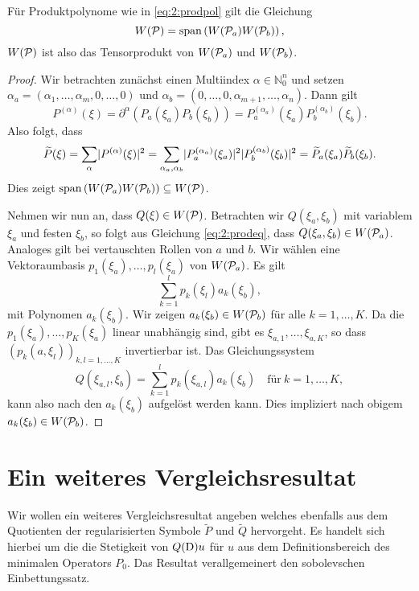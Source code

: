 \begin{thm}
Für Produktpolynome wie in \eqref{eq:2:prodpol}
gilt die Gleichung
\begin{equation}
W(\mathcal P)=\operatorname{span}\left(W(\mathcal P_a) W(\mathcal P_b)\right),
\end{equation}
$W(\mathcal P)$ ist also das Tensorprodukt von $W(\mathcal P_a)$ und $W(\mathcal P_b)$.
\end{thm}
\begin{proof}
Wir betrachten zunächst einen Multiindex $\alpha\in\mathbb N_0^n$ und setzen $\alpha_a=(\alpha_1,\dots,\alpha_m,0,\dots,0)$
und $\alpha_b=(0,\dots,0,\alpha_{m+1},\dots,\alpha_n)$. Dann gilt
\begin{equation}
P^{(\alpha)}(\xi)
=\partial^\alpha\left(P_a(\xi_a)P_b(\xi_b)\right)
=P^{(\alpha_a)}_a(\xi_a)P^{(\alpha_b)}_b(\xi_b).
\end{equation} 
Also folgt, dass
\begin{equation}\label{eq:2:prodeq}
\widetilde{P}(\xi)=\sum_\alpha\lvert P^{(\alpha)}(\xi)\rvert^2
=\sum_{\alpha_a,\alpha_b}\lvert P^{(\alpha_a)}_a(\xi_a)\rvert^2\lvert P^{(\alpha_b)}_b(\xi_b)\rvert^2
=\widetilde{P}_a(\xi_a)\widetilde{P}_b(\xi_b).
\end{equation}
Dies zeigt $\operatorname{span}\left(W(\mathcal P_a) W(\mathcal P_b)\right)\subseteq W(\mathcal P)$. 

Nehmen wir nun an, dass $Q(\xi)\in W(\mathcal P)$.
Betrachten wir $Q(\xi_a,\xi_{b})$ mit variablem $\xi_a$ und festen $\xi_{b}$,
so folgt aus Gleichung \eqref{eq:2:prodeq},
dass $Q(\xi_a,\xi_{b})\in W(\mathcal P_a)$.
Analoges gilt bei vertauschten Rollen von $a$ und $b$.
Wir wählen eine Vektoraumbasis $p_1(\xi_a),\dots,p_l(\xi_a)$ von $W(\mathcal P_a)$.
Es gilt
\begin{equation}
\sum_{k=1}^lp_k(\xi_l)a_k(\xi_b),
\end{equation}
mit Polynomen $a_k(\xi_b)$.
Wir zeigen $a_k(\xi_b)\in W(\mathcal P_b)$ für alle $k=1,\dots,K$.
Da die $p_1(\xi_a),\dots,p_K(\xi_a)$ linear unabhängig sind,
gibt es $\xi_{a,1},\dots,\xi_{a,K}$,
so dass $\left(p_k(a,\xi_l)\right)_{k,l=1,\dots,K}$ invertierbar ist.
Das Gleichungssystem
\begin{equation}
Q(\xi_{a,l},\xi_b)=\sum_{k=1}^lp_k(\xi_{a,l})a_k(\xi_b)\quad\text{für}~k=1,\dots,K,
\end{equation}
kann also nach den $a_k(\xi_b)$ aufgelöst werden kann.
Dies impliziert nach obigem $a_k(\xi_b)\in W(\mathcal P_b)$.
\end{proof}

\section{Ein weiteres Vergleichsresultat}
Wir wollen ein weiteres Vergleichsresultat angeben welches ebenfalls aus dem Quotienten der regularisierten Symbole $\widetilde{P}$ und $ \widetilde{Q}$ hervorgeht. Es handelt sich hierbei um die die Stetigkeit von $Q(\mathrm D) u$ für $u$ aus dem Definitionsbereich des minimalen Operators $P_0$. Das Resultat verallgemeinert den sobolevschen Einbettungssatz.

